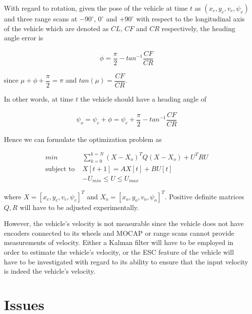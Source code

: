 \documentclass[oneside,12pt]{article}
\begin{document}
\begin{itemize}
    With regard to rotation, given the pose of the vehicle at time $t$ as
    $(x_c, y_c, v_c, \psi_v)$ and three range scans at $-90^\circ$, $0^\circ$ and
    $+90^\circ$ with respect to the longitudinal axis of the vehicle which are
    denoted as $CL$, $CF$ and $CR$ respectively, the heading angle error is

    \begin{align}
      \phi = \dfrac{\pi}{2} - tan^{-1}\dfrac{CF}{CR}
    \end{align}

    since $\mu + \phi + \dfrac{\pi}{2} = \pi$ and $tan(\mu) = \dfrac{CF}{CR}$.

    In other words, at time $t$ the vehicle should have a heading angle of

    \begin{align}
      \psi_o = \psi_c + \phi = \psi_c + \dfrac{\pi}{2} - tan^{-1}\dfrac{CF}{CR}
    \end{align}


    \begin{figure}[H]\centering
      \scalebox{1}{}
      \caption{}
      \label{}
    \end{figure}

    Hence we can formulate the optimization problem as

    \begin{align}
      min &\sum\limits_{k=0}^{k=N} (X-X_o)^T Q (X-X_o) + U^T R U \\
      \text{subject to } & X[t+1] = A X[t] + B U[t] \\
      & -U_{min} \leq U \leq U_{max}
    \end{align}

    where $X=[x_c, y_c, v_c, \psi_c]^T$ and $X_o = [x_o, y_o, v_o, \psi_o]^T$.
    Positive definite matrices $Q,R$ will have to be adjusted experimentally.

    However, the vehicle's velocity is not measurable since the vehicle does not
    have encoders connected to its wheels and MOCAP or range scans cannot
    provide measurements of velocity. Either a Kalman filter will have to be
    employed in order to estimate the vehicle's velocity, or the ESC feature of
    the vehicle will have to be investigated with regard to its ability to
    ensure that the input velocity is indeed the vehicle's velocity.
\end{itemize}



\section{Issues}
\end{document}
